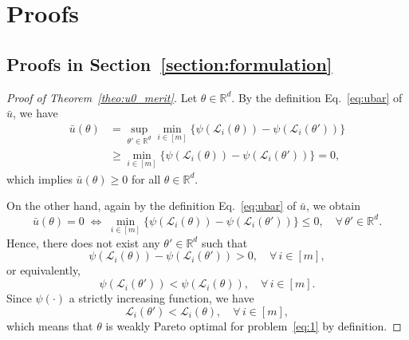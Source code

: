 \documentclass[sigconf]{acmart}
\begin{document}



\clearpage
\appendix

\section{Proofs}
\subsection{Proofs in Section~\ref{section:formulation}}
\begin{proof}[Proof of Theorem~\ref{theo:u0_merit}]
Let $\theta\in \mathbb{R}^d$. By the definition Eq.~\eqref{eq:ubar} of $\bar{u}$, we have
\begin{align*}
\bar{u}(\theta)
&=
\sup_{\theta'\in \mathbb{R}^d}
\min_{i\in[m]}
\bigl\{\psi(\mathcal{L}_i(\theta))-\psi(\mathcal{L}_i(\theta'))\bigr\}\\
&\geq
\min_{i\in[m]}
\bigl\{\psi(\mathcal{L}_i(\theta))-\psi(\mathcal{L}_i(\theta'))\bigr\}
=0, 
\end{align*}
which implies $\bar{u}(\theta)\ge 0$ for all $\theta\in \mathbb{R}^d$.

On the other hand, again by the definition Eq.~\eqref{eq:ubar} of $\bar{u}$, we obtain
\[
\bar{u}(\theta)=0
\;\Longleftrightarrow\;
\min_{i\in[m]}
\bigl\{\psi(\mathcal{L}_i(\theta))-\psi(\mathcal{L}_i(\theta'))\bigr\}\le 0,
\quad \forall\,\theta'\in \mathbb{R}^d.
\]
Hence, there does not exist any $\theta'\in \mathbb{R}^d$ such that
\[
\psi(\mathcal{L}_i(\theta))-\psi(\mathcal{L}_i(\theta'))>0,
\quad \forall\, i\in[m],
\]
or equivalently,
\[
\psi(\mathcal{L}_i(\theta'))<\psi(\mathcal{L}_i(\theta)),
\quad \forall\, i\in[m].
\]
Since $\psi(\cdot)$ a strictly increasing function, we have 
\[
\mathcal{L}_i(\theta')<\mathcal{L}_i(\theta),
\quad \forall\, i\in[m],
\]
which means that $\theta$ is weakly Pareto optimal for problem~\eqref{eq:1} by definition.
\end{proof}
\end{document}
